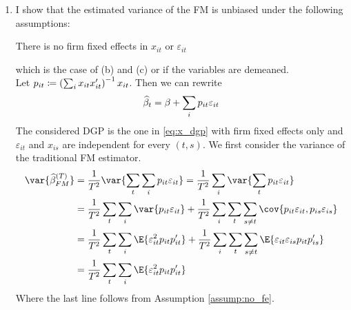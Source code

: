 \begin{solution}
\begin{enumerate}[label = (\alph*)]
    \item I show that the estimated variance of the FM is unbiased under the following assumptions:
    \begin{assump}
        \label{assump:no_fe}
        There is no firm fixed effects in \(x_{it}\) or \(\varepsilon_{it}\)
    \end{assump}
    which is the case of (b) and (c) or if the variables are demeaned. \\
    Let \(p_{it} \coloneqq \left( \sum_i x_{it}x_{it}^\prime \right)^{-1}x_{it}\). Then we can rewrite 
    \[
        \widehat{\beta}_t = \beta + \sum_i p_{it}\varepsilon_{it}
    \]
    The considered DGP is the one in \eqref{eq:x_dgp} with firm fixed effects only and \(\varepsilon_{it}\) and \(x_{is}\) are independent for every \((t,s)\). We first consider the variance of the traditional FM estimator. 
    \begin{align*}
        \var{\wh\beta^{(T)}_{FM}} & = \frac{1}{T^2} \var{\sum_t\sum_i p_{it}\varepsilon_{it}} = \frac{1}{T^2}\sum_i \var{\sum_t p_{it}\varepsilon_{it}} \\
        & = \frac{1}{T^2}\sum_t\sum_i \var{p_{it}\varepsilon_{it}} + \frac{1}{T^2}\sum_i\sum_t\sum_{s\neq t}\cov{p_{it}\varepsilon_{it}, p_{is}\varepsilon_{is}} \\
        & = \frac{1}{T^2}\sum_t\sum_i \E{\varepsilon_{it}^2p_{it}p_{it}^\prime} + \frac{1}{T^2}\sum_i\sum_t\sum_{s\neq t}\E{\varepsilon_{it}\varepsilon_{is}p_{it}p_{is}^\prime} \\
        & = \frac{1}{T^2}\sum_t\sum_i\E{\varepsilon_{it}^2 p_{it}p_{it}^\prime} 
    \end{align*}
    Where the last line follows from Assumption \ref{assump:no_fe}.
    

\end{enumerate}
\end{solution}
